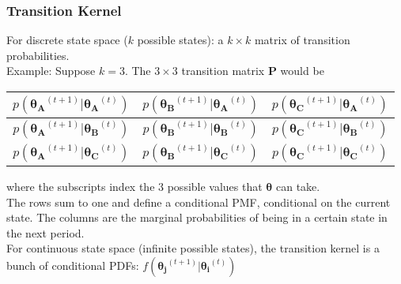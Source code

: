 \documentclass[handout]{beamer}
\begin{document}
\begin{frame}
\frametitle{Transition Kernel}
\pause
For discrete state space ($k$ possible states): \pause a $k \times k$ matrix of transition probabilities.\\
\bigskip
\pause
Example: Suppose $k = 3$.  \pause The $3 \times 3$ transition matrix
$\bm{P}$ would be
\begin{table}[!htp]
\begin{center}
\begin{tabular}{|c|c|c|}
\hline
$p(\bm{\theta_A}^{(t+1)} | \bm{\theta_A}^{(t)} )$ & $p(\bm{\theta_B}^{(t+1)} |
\bm{\theta_A}^{(t)} )$ & $p(\bm{\theta_C}^{(t+1)} |
\bm{\theta_A}^{(t)} )$ \\
\hline
$p(\bm{\theta_A}^{(t+1)} | \bm{\theta_B}^{(t)} )$ & $p(\bm{\theta_B}^{(t+1)} |
\bm{\theta_B}^{(t)} )$ & $p(\bm{\theta_C}^{(t+1)} |
\bm{\theta_B}^{(t)} )$ \\
\hline
$p(\bm{\theta_A}^{(t+1)} | \bm{\theta_C}^{(t)} )$ & $p(\bm{\theta_B}^{(t+1)} |
\bm{\theta_C}^{(t)} )$ & $p(\bm{\theta_C}^{(t+1)} |
\bm{\theta_C}^{(t)} )$ \\
\hline
\end{tabular}
\end{center}
\end{table}
where the subscripts index the 3 possible values that $\bm{\theta}$
can take.  \\
\bigskip
\pause
The rows sum to one and define a conditional PMF, conditional on the
current state.  \pause The columns
are the marginal probabilities of being in a certain state in the next
period.\\
\pause
\bigskip
For continuous state space (infinite possible states), the transition
kernel is a bunch of conditional PDFs: $f(\bm{\theta_j}^{(t+1)} | \bm{\theta_i}^{(t)})$
\end{frame}
\end{document}

